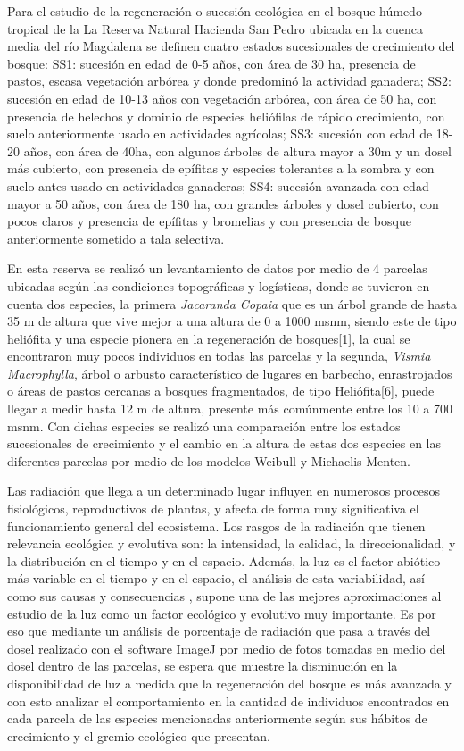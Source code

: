 \documentclass[letterpaper,9pt,twocolumn,twoside,]{pinp}
\begin{document}
Para el estudio de la regeneración o sucesión ecológica en el bosque
húmedo tropical de la La Reserva Natural Hacienda San Pedro ubicada en
la cuenca media del río Magdalena se definen cuatro estados sucesionales
de crecimiento del bosque: SS1: sucesión en edad de 0-5 años, con área
de 30 ha, presencia de pastos, escasa vegetación arbórea y donde
predominó la actividad ganadera; SS2: sucesión en edad de 10-13 años con
vegetación arbórea, con área de 50 ha, con presencia de helechos y
dominio de especies heliófilas de rápido crecimiento, con suelo
anteriormente usado en actividades agrícolas; SS3: sucesión con edad de
18-20 años, con área de 40ha, con algunos árboles de altura mayor a 30m
y un dosel más cubierto, con presencia de epífitas y especies tolerantes
a la sombra y con suelo antes usado en actividades ganaderas; SS4:
sucesión avanzada con edad mayor a 50 años, con área de 180 ha, con
grandes árboles y dosel cubierto, con pocos claros y presencia de
epífitas y bromelias y con presencia de bosque anteriormente sometido a
tala selectiva.

En esta reserva se realizó un levantamiento de datos por medio de 4
parcelas ubicadas según las condiciones topográficas y logísticas, donde
se tuvieron en cuenta dos especies, la primera \emph{Jacaranda Copaia}
que es un árbol grande de hasta 35 m de altura que vive mejor a una
altura de 0 a 1000 msnm, siendo este de tipo heliófita y una especie
pionera en la regeneración de bosques{[}1{]}, la cual se encontraron muy
pocos individuos en todas las parcelas y la segunda, \emph{Vismia
Macrophylla}, árbol o arbusto característico de lugares en barbecho,
enrastrojados o áreas de pastos cercanas a bosques fragmentados, de tipo
Heliófita{[}6{]}, puede llegar a medir hasta 12 m de altura, presente
más comúnmente entre los 10 a 700 msnm\citep{vismia}. Con dichas
especies se realizó una comparación entre los estados sucesionales de
crecimiento y el cambio en la altura de estas dos especies en las
diferentes parcelas por medio de los modelos Weibull y Michaelis Menten.

Las radiación que llega a un determinado lugar influyen en numerosos
procesos fisiológicos, reproductivos de plantas, y afecta de forma muy
significativa el funcionamiento general del ecosistema. Los rasgos de la
radiación que tienen relevancia ecológica y evolutiva son: la
intensidad, la calidad, la direccionalidad, y la distribución en el
tiempo y en el espacio. Además, la luz es el factor abiótico más
variable en el tiempo y en el espacio, el análisis de esta variabilidad,
así como sus causas y consecuencias , supone una de las mejores
aproximaciones al estudio de la luz como un factor ecológico y evolutivo
muy importante. \citep{vallares} Es por eso que mediante un análisis de
porcentaje de radiación que pasa a través del dosel realizado con el
software ImageJ por medio de fotos tomadas en medio del dosel dentro de
las parcelas, se espera que muestre la disminución en la disponibilidad
de luz a medida que la regeneración del bosque es más avanzada y con
esto analizar el comportamiento en la cantidad de individuos encontrados
en cada parcela de las especies mencionadas anteriormente según sus
hábitos de crecimiento y el gremio ecológico que presentan.
\end{document}
